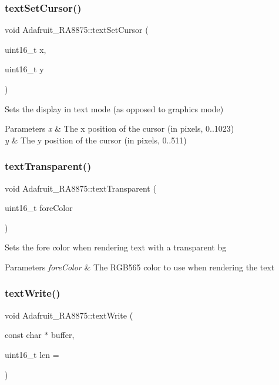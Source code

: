 \subsubsection{\texorpdfstring{textSetCursor()}{textSetCursor()}}
{\footnotesize\ttfamily void Adafruit\+\_\+\+R\+A8875\+::text\+Set\+Cursor (\begin{DoxyParamCaption}\item[{uint16\+\_\+t}]{x,  }\item[{uint16\+\_\+t}]{y }\end{DoxyParamCaption})}

Sets the display in text mode (as opposed to graphics mode)


\begin{DoxyParams}{Parameters}
{\em x} & The x position of the cursor (in pixels, 0..1023) \\
\hline
{\em y} & The y position of the cursor (in pixels, 0..511) \\
\hline
\end{DoxyParams}
\mbox{\label{class_adafruit___r_a8875_adcb9cc6b7e2b4d03a32a5fc87e033164}} 
\subsubsection{\texorpdfstring{textTransparent()}{textTransparent()}}
{\footnotesize\ttfamily void Adafruit\+\_\+\+R\+A8875\+::text\+Transparent (\begin{DoxyParamCaption}\item[{uint16\+\_\+t}]{fore\+Color }\end{DoxyParamCaption})}

Sets the fore color when rendering text with a transparent bg


\begin{DoxyParams}{Parameters}
{\em fore\+Color} & The R\+G\+B565 color to use when rendering the text \\
\hline
\end{DoxyParams}
\mbox{\label{class_adafruit___r_a8875_af2b427d3d6e429aeccbeb956c4159456}} 
\subsubsection{\texorpdfstring{textWrite()}{textWrite()}}
{\footnotesize\ttfamily void Adafruit\+\_\+\+R\+A8875\+::text\+Write (\begin{DoxyParamCaption}\item[{const char $\ast$}]{buffer,  }\item[{uint16\+\_\+t}]{len = {} }\end{DoxyParamCaption})}

